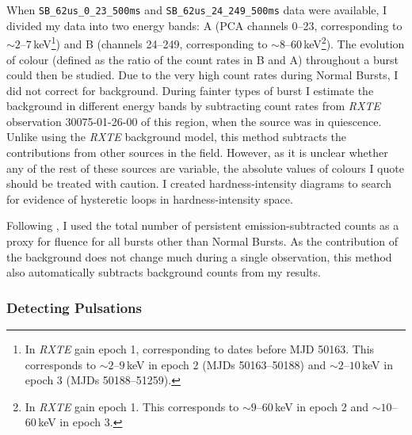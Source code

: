 \par When \texttt{SB\_62us\_0\_23\_500ms} and \texttt{SB\_62us\_24\_249\_500ms} data were available, I divided my data into two energy bands: A (PCA channels 0--23, corresponding to $\sim2$--$7$\,keV\footnote{In \textit{RXTE} gain epoch 1, corresponding to dates before MJD 50163.  This corresponds to $\sim2$--$9$\,keV in epoch 2 (MJDs 50163--50188) and $\sim2$--$10$\,keV in epoch 3 (MJDs 50188--51259).}) and B (channels 24--249, corresponding to $\sim8$--$60$\,keV\footnote{In \textit{RXTE} gain epoch 1.  This corresponds to $\sim9$--$60$\,keV in epoch 2 and $\sim10$--$60$\,keV in epoch 3.}).  The evolution of colour (defined as the ratio of the count rates in B and A) throughout a burst could then be studied.  Due to the very high count rates during Normal Bursts, I did not correct for background.  During fainter types of burst I estimate the background in different energy bands by subtracting count rates from \indexrxte\textit{RXTE} observation 30075-01-26-00 of this region, when the source was in quiescence.  Unlike using the \textit{RXTE} background model, this method subtracts the contributions from other sources in the field.  However, as it is unclear whether any of the rest of these sources are variable, the absolute values of colours I quote should be treated with caution.  I created hardness-intensity diagrams to search for evidence of hysteretic loops in hardness-intensity space.
\par Following \citet{Bagnoli_PopStudy}, I used the total number of persistent emission-subtracted counts as a proxy for fluence for all bursts other than Normal Bursts.  As the contribution of the background does not change much during a single observation, this method also automatically subtracts background counts from my results.

\subsubsection{Detecting Pulsations}

